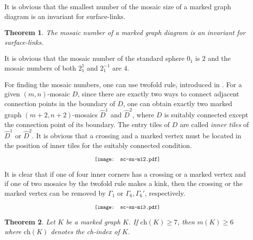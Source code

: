 \documentclass{article}
\newtheorem{theorem}{Theorem}
\theoremstyle{definition}
\begin{document}
It is obvious that the smallest number of the mosaic size of a marked graph diagram is an invariant for surface-links. 

\begin{theorem}
The mosaic number of a marked graph diagram is an invariant for surface-links. 
\end{theorem}

It is obvious that the mosaic number of the standard sphere $0_1$ is $2$ and the mosaic numbers of both $2_{1}^{1}$ and $2_{1}^{-1}$ are $4$.


For finding the mosaic numbers, one can use twofold rule, introduced in \cite{OHLL}. %
For a given $(m, n)$-mosaic $D$, 
since there are exactly two ways to connect adjacent connection points in the boundary of $D$,
one can obtain exactly two marked graph $(m+2, n+2)$-mosaics $\widehat{D}^{1}$ and $\widehat{D}^{2}$,
where $D$ is suitably connected except the connection point of its boundary. 
The entry tiles of $D$ are called {\it inner tiles} of $\widehat{D}^{1}$ or $\widehat{D}^{2}$.
It is obvious that a crossing and a marked vertex must be located in the position of inner tiles for the suitably connected condition. 

\[\scalebox{0.8}{\texttt{[image: sc-sn-m12.pdf]}}\]

It is clear that if one of four inner corners has a crossing or a marked vertex and if one of two mosaics by the twofold rule makes a kink, then the crossing or the marked vertex can be removed by $\Gamma_{1}$ or $\Gamma_{6}, \Gamma_{6}'$, respectively.

\[\scalebox{0.8}{\texttt{[image: sc-sn-m13.pdf]}}\]


\begin{theorem}\label{Mnbr6}
Let $K$ be a marked graph $K$. 
If $\mathrm{ch}(K)\ge 7$, then $m(K)\geq6$ where $\mathrm{ch}(K)$ denotes the ch-index of $K$. 
\end{theorem}
\end{document}
